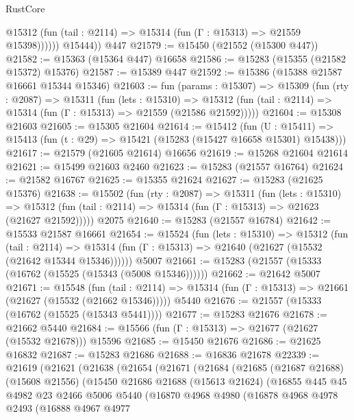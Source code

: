 \begin{lexlean}{RustCore}
\begin{coremodule}
              @15312 (fun (tail : @2114) => @15314 (fun (Γ : @15313) => @21559 @15398))))))
        @15444))
    @447
@21579 := @15450 (@21552 (@15300 @447))
@21582 := @15363 (@15364 @447) @16658
@21586 := @15283 (@15355 (@21582 @15372) @15376)
@21587 := @15389 @447
@21592 := @15386 (@15388 @21587 @16661 @15344 @15346)
@21603 := fun (params : @15307) =>
  @15309
    (fun (rty : @2087) =>
    @15311
      (fun (lets : @15310) =>
      @15312 (fun (tail : @2114) => @15314 (fun (Γ : @15313) => @21559 (@21586 @21592)))))
@21604 := @15308 @21603
@21605 := @15305 @21604
@21614 := @15412
    (fun (U : @15411) => @15413 (fun (t : @29) => @15421 (@15283 (@15427 @16658 @15301) @15438)))
@21617 := @21579 (@21605 @21614) @16656
@21619 := @15268 @21604 @21614
@21621 := @15499 @21603 @2460
@21623 := @15283 (@21557 @16764)
@21624 := @21582 @16767
@21625 := @15355 @21624
@21627 := @15283 (@21625 @15376)
@21638 := @15502
    (fun (rty : @2087) =>
    @15311
      (fun (lets : @15310) =>
      @15312 (fun (tail : @2114) => @15314 (fun (Γ : @15313) => @21623 (@21627 @21592)))))
    @2075
@21640 := @15283 (@21557 @16784)
@21642 := @15533 @21587 @16661
@21654 := @15524
    (fun (lets : @15310) =>
    @15312
      (fun (tail : @2114) =>
      @15314 (fun (Γ : @15313) => @21640 (@21627 (@15532 (@21642 @15344 @15346))))))
    @5007
@21661 := @15283 (@21557 (@15333 (@16762 (@15525 (@15343 (@5008 @15346))))))
@21662 := @21642 @5007
@21671 := @15548
    (fun (tail : @2114) => @15314 (fun (Γ : @15313) => @21661 (@21627 (@15532 (@21662 @15346)))))
    @5440
@21676 := @21557 (@15333 (@16762 (@15525 (@15343 @5441))))
@21677 := @15283 @21676
@21678 := @21662 @5440
@21684 := @15566 (fun (Γ : @15313) => @21677 (@21627 (@15532 @21678))) @15596
@21685 := @15450 @21676
@21686 := @21625 @16832
@21687 := @15283 @21686
@21688 := @16836 @21678
@22339 := @21619
    (@21621
      (@21638
        (@21654
          (@21671
            (@21684
              (@21685
                (@21687 @21688)
                (@15608 @21556)
                (@15450
                  @21686
                  @21688
                  (@15613 @21624)
                  (@16855
                    @445
                    @45
                    @4982
                    @23
                    @2466
                    @5006
                    @5440
                    (@16870
                      @4968
                      @4980
                      (@16878
                        @4968
                        @4978
                        @2493
                        (@16888
                          @4967
                          @4977

\end{coremodule}
\end{lexlean}
